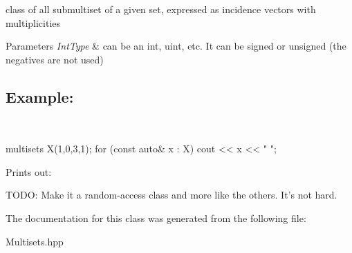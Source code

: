 class of all submultiset of a given set, expressed as incidence vectors with multiplicities 


\begin{DoxyParams}{Parameters}
{\em Int\-Type} & can be an int, uint, etc. It can be signed or unsigned (the negatives are not used) \subsection*{Example\-:}\\
\hline
\end{DoxyParams}
\begin{DoxyVerb}multisets X({1,0,3,1});
for (const auto& x : X)
    cout << x << " ";
\end{DoxyVerb}


Prints out\-: \begin{DoxyVerb}[ 0 0 0 0 ]
[ 1 0 0 0 ]
[ 0 0 1 0 ]
[ 1 0 1 0 ]
[ 0 0 2 0 ]
[ 1 0 2 0 ]
[ 0 0 3 0 ]
[ 1 0 3 0 ]
[ 0 0 0 1 ]
[ 1 0 0 1 ]
[ 0 0 1 1 ]
[ 1 0 1 1 ]
[ 0 0 2 1 ]
[ 1 0 2 1 ]
[ 0 0 3 1 ]
[ 1 0 3 1 ]
\end{DoxyVerb}


T\-O\-D\-O\-: Make it a random-\/access class and more like the others. It's not hard. 

The documentation for this class was generated from the following file\-:\begin{DoxyCompactItemize}
\item 
Multisets.\-hpp\end{DoxyCompactItemize}
